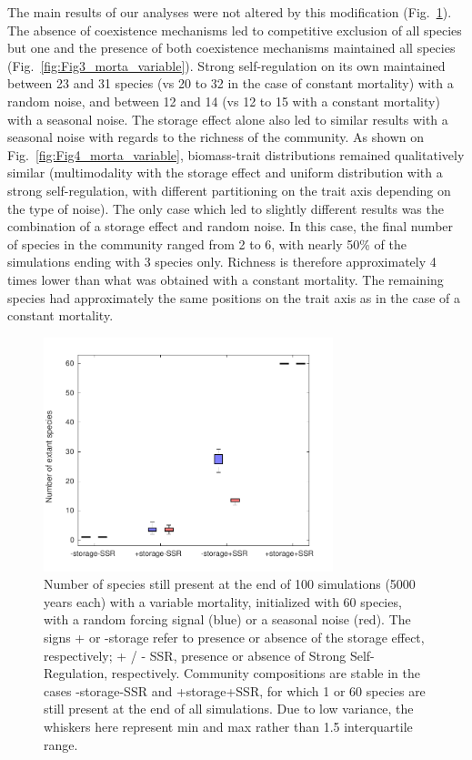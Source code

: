 \documentclass[a4paper,12pt]{article}
\begin{document}
The main results of our analyses were not altered by this modification (Fig.~\ref{fig:Nb_extant_morta_variable}). The absence of coexistence mechanisms led to competitive exclusion of all species but one and the presence of both coexistence mechanisms maintained all species (Fig.~\ref{fig:Fig3_morta_variable}). Strong self-regulation on its own maintained between 23 and 31 species (vs 20 to 32 in the case of constant mortality) with a random noise, and between 12 and 14 (vs 12 to 15 with a constant mortality) with a seasonal noise. The storage effect alone also led to similar results with a seasonal noise with regards to the richness of the community. As shown on Fig.~\ref{fig:Fig4_morta_variable}, biomass-trait distributions remained qualitatively similar (multimodality with the storage effect and uniform distribution with a strong self-regulation, with different partitioning on the trait axis depending on the type of noise). The only case which led to slightly different results was the combination of a storage effect and random noise. In this case, the final number of species in the community ranged from 2 to 6, with nearly 50\% of the simulations ending with 3 species only. Richness is therefore approximately 4 times lower than what was obtained with a constant mortality. The remaining species had approximately the same positions on the trait axis as in the case of a constant mortality. 

\begin{figure}[!ht]
\begin{centering}
\includegraphics[width=0.75\textwidth]{Fig2_mortavariable.pdf}
\par\end{centering}
\caption{Number of species still present at the end of 100 simulations (5000 years each) with a variable mortality,
initialized with 60 species, with a random forcing signal (blue) or a seasonal noise (red). The
signs + or -storage refer to presence or absence of the storage effect, respectively; + / - SSR,
presence or absence of Strong Self-Regulation, respectively. Community compositions are stable
in the cases -storage-SSR and +storage+SSR, for which 1 or 60 species are still present at the
end of all simulations. Due to low variance, the whiskers here represent min and
max rather than 1.5 interquartile range.\label{fig:Nb_extant_morta_variable}}
\end{figure}
\end{document}
